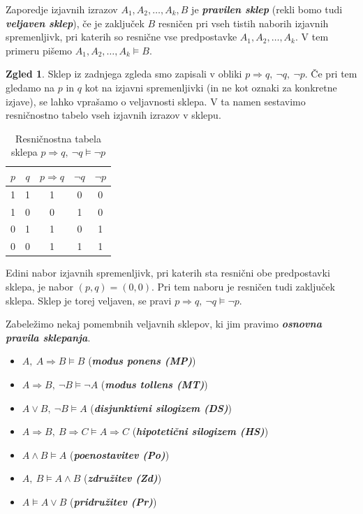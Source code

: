 \documentclass[11pt]{book}
\def\definicija{\color{rdeca}\bf\em}
\theoremstyle{definition}
\theoremstyle{zgled}
\newtheorem*{zgled}{Zgled}
\theoremstyle{odprtproblem}
\theoremstyle{domacanaloga}
\theoremstyle{izrek}
\begin{document}
Zaporedje izjavnih izrazov $A_1, A_2, \dots, A_k, B$ je {\definicija pravilen sklep} (rekli bomo tudi {\definicija veljaven sklep}), če je zaključek $B$ resničen pri vseh tistih naborih izjavnih spremenljivk, pri katerih so resnične vse predpostavke $A_1, A_2, \dots, A_k$. V tem primeru pišemo $A_1, A_2, \dots, A_k \models B$.

\begin{zgled}
Sklep iz zadnjega zgleda smo zapisali v obliki $p \Rightarrow q, \ \lnot q, \ \lnot p$. Če pri tem gledamo na $p$ in $q$ kot na izjavni spremenljivki (in ne kot oznaki za konkretne izjave), se lahko vprašamo o veljavnosti sklepa. V ta namen sestavimo resničnostno tabelo vseh izjavnih izrazov v sklepu.

\begin{table}[h]
    \centering
    \begin{tabular}{cc|ccc}
        $p$ & $q$ & $p \Rightarrow q$ & $\lnot q$ & $\lnot p$ \\ \hline
        1 & 1 & 1 & 0 & 0 \\
        1 & 0 & 0 & 1 & 0 \\
        0 & 1 & 1 & 0 & 1 \\
        0 & 0 & 1 & 1 & 1
    \end{tabular}
    \caption{Resničnostna tabela sklepa $p \Rightarrow q, \ \lnot q \models \lnot p$}
\end{table}

Edini nabor izjavnih spremenljivk, pri katerih sta resnični obe predpostavki sklepa, je nabor $(p,q)=(0,0)$. Pri tem naboru je resničen tudi zaključek sklepa. Sklep je torej veljaven, se pravi $p \Rightarrow q, \ \lnot q \models \lnot p$.
\end{zgled}

Zabeležimo nekaj pomembnih veljavnih sklepov, ki jim pravimo {\definicija osnovna pravila sklepanja}.

\begin{itemize}
    \item $A, \ A \Rightarrow B \models B$ ({\definicija modus ponens (MP)})
    \item $A \Rightarrow B, \ \lnot B \models \lnot A$ ({\definicija modus tollens (MT)})
    \item $A \lor B, \ \lnot B \models A$ ({\definicija disjunktivni silogizem (DS)})
    \item $A \Rightarrow B, \ B \Rightarrow C \models A \Rightarrow C$ ({\definicija hipotetični silogizem (HS)})
    \item $A \land B \models A$ ({\definicija poenostavitev (Po)})
    \item $A, \ B \models A \land B$ ({\definicija združitev (Zd)})
    \item $A \models A \lor B$ ({\definicija pridružitev (Pr)})
\end{itemize}
\end{document}
